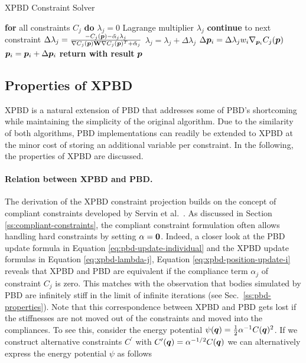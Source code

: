 \begin{algorithm}
\caption{XPBD Constraint Solver}\label{alg:xpbd-solver}
\begin{algorithmic}[1]
\State \textbf{for} all constraints $C_j$ \textbf{do} $\lambda_j = 0$
\StatexIndent[3] Lagrange multiplier $\lambda_j$ \algorithmicdo
{}
\State \textbf{continue} to next constraint
\EndIf
\State $\Delta \lambda_j = \frac{-C_j(\bm{p}) - \tilde{\alpha}_j \lambda_{j}}{\nabla C_j(\bm{p}) \mathbf{W} \nabla C_j(\bm{p})^T + \tilde{\alpha}_j}$
\State $\lambda_{j} = \lambda_{j} + \Delta \lambda_j$
\State $\Delta \bm{p}_i = \Delta \lambda_j w_i \nabla_{\bm{p}_i} C_j(\bm{p})$
\State $\bm{p}_i = \bm{p}_i + \Delta \bm{p}_i$
\EndFor
\EndFor
\EndFor
\State \textbf{return with result } $\bm{p}$
\EndProcedure
\end{algorithmic}
\end{algorithm}

\subsection{Properties of XPBD}\label{ss:xpbd-properties}
XPBD is a natural extension of PBD that addresses some of PBD's shortcoming while maintaining the simplicity of the original algorithm. Due to
the similarity of both algorithms, PBD implementations can readily be extended to XPBD at the minor cost of storing an additional variable per 
constraint. In the following, the properties of XPBD are discussed.

\paragraph{Relation between XPBD and PBD.}
The derivation of the XPBD constraint projection builds on the concept of compliant constraints developed by Servin et al.\ 
\cite{servin2006}. As discussed in Section \ref{ss:compliant-constraints}, the compliant constraint formulation often allows handling hard constraints by
setting $\mathbf{\alpha} = \mathbf{0}$. Indeed, a closer look at the PBD update formula in Equation \ref{eq:pbd-update-individual} and the XPBD update 
formulas in Equation \ref{eq:xpbd-lambda-j}, Equation \ref{eq:xpbd-position-update-i} reveals that XPBD and 
PBD are equivalent if the compliance term $\alpha_j$ of constraint $C_j$ is zero. This matches with the observation that bodies 
simulated by PBD are infinitely stiff in the limit of infinite iterations (see Sec.\ \ref{ss:pbd-properties}). Note that this correspondence between XPBD 
and PBD gets lost if the stiffnesses are not moved out of the constraints and moved into the compliances. To see this, consider the energy 
potential $\psi(\bm{q}) = \frac{1}{2} \alpha^{-1} C(\bm{q})^2$. If we construct alternative constraints $C^\prime$ with $C^\prime(\bm{q}) = 
\alpha^{-1/2}C(\bm{q})$ we can alternatively express the energy potential $\psi$ as follows


